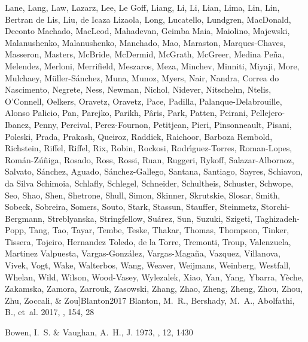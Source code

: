 \documentclass[onecolumn]{aa}
\begin{document}
\begin{thebibliography}{149}
{		{Lane}, {Lang}, {Law}, {Lazarz}, {Lee}, {Le Goff}, {Liang}, {Li}, {Li},
		{Lian}, {Lima}, {Lin}, {Lin}, {Bertran de Lis}, {Liu}, {de Icaza Lizaola},
		{Long}, {Lucatello}, {Lundgren}, {MacDonald}, {Deconto Machado}, {MacLeod},
		{Mahadevan}, {Geimba Maia}, {Maiolino}, {Majewski}, {Malanushenko},
		{Malanushenko}, {Manchado}, {Mao}, {Maraston}, {Marques-Chaves}, {Masseron},
		{Masters}, {McBride}, {McDermid}, {McGrath}, {McGreer}, {Medina Pe{\~n}a},
		{Melendez}, {Merloni}, {Merrifield}, {Meszaros}, {Meza}, {Minchev},
		{Minniti}, {Miyaji}, {More}, {Mulchaey}, {M{\"u}ller-S{\'a}nchez}, {Muna},
		{Munoz}, {Myers}, {Nair}, {Nandra}, {Correa do Nascimento}, {Negrete},
		{Ness}, {Newman}, {Nichol}, {Nidever}, {Nitschelm}, {Ntelis}, {O'Connell},
		{Oelkers}, {Oravetz}, {Oravetz}, {Pace}, {Padilla}, {Palanque-Delabrouille},
		{Alonso Palicio}, {Pan}, {Parejko}, {Parikh}, {P{\^a}ris}, {Park}, {Patten},
		{Peirani}, {Pellejero-Ibanez}, {Penny}, {Percival}, {Perez-Fournon},
		{Petitjean}, {Pieri}, {Pinsonneault}, {Pisani}, {Poleski}, {Prada},
		{Prakash}, {Queiroz}, {Raddick}, {Raichoor}, {Barboza Rembold}, {Richstein},
		{Riffel}, {Riffel}, {Rix}, {Robin}, {Rockosi}, {Rodr{\'\i}guez-Torres},
		{Roman-Lopes}, {Rom{\'a}n-Z{\'u}{\~n}iga}, {Rosado}, {Ross}, {Rossi}, {Ruan},
		{Ruggeri}, {Rykoff}, {Salazar-Albornoz}, {Salvato}, {S{\'a}nchez}, {Aguado},
		{S{\'a}nchez-Gallego}, {Santana}, {Santiago}, {Sayres}, {Schiavon}, {da Silva
			Schimoia}, {Schlafly}, {Schlegel}, {Schneider}, {Schultheis}, {Schuster},
		{Schwope}, {Seo}, {Shao}, {Shen}, {Shetrone}, {Shull}, {Simon}, {Skinner},
		{Skrutskie}, {Slosar}, {Smith}, {Sobeck}, {Sobreira}, {Somers}, {Souto},
		{Stark}, {Stassun}, {Stauffer}, {Steinmetz}, {Storchi-Bergmann},
		{Streblyanska}, {Stringfellow}, {Su{\'a}rez}, {Sun}, {Suzuki}, {Szigeti},
		{Taghizadeh-Popp}, {Tang}, {Tao}, {Tayar}, {Tembe}, {Teske}, {Thakar},
		{Thomas}, {Thompson}, {Tinker}, {Tissera}, {Tojeiro}, {Hernandez Toledo}, {de
			la Torre}, {Tremonti}, {Troup}, {Valenzuela}, {Martinez Valpuesta},
		{Vargas-Gonz{\'a}lez}, {Vargas-Maga{\~n}a}, {Vazquez}, {Villanova}, {Vivek},
		{Vogt}, {Wake}, {Walterbos}, {Wang}, {Weaver}, {Weijmans}, {Weinberg},
		{Westfall}, {Whelan}, {Wild}, {Wilson}, {Wood-Vasey}, {Wylezalek}, {Xiao},
		{Yan}, {Yang}, {Ybarra}, {Y{\`e}che}, {Zakamska}, {Zamora}, {Zarrouk},
		{Zasowski}, {Zhang}, {Zhao}, {Zheng}, {Zheng}, {Zhou}, {Zhou}, {Zhu},
		{Zoccali}, \& {Zou}}]{Blanton2017}
	{Blanton}, M.~R., {Bershady}, M.~A., {Abolfathi}, B., {et~al.} 2017, \aj, 154,
	28
	
	{Bowen}, I.~S. \& {Vaughan}, A.~H., J. 1973, \ao, 12, 1430
	

\end{thebibliography}
\end{document}
